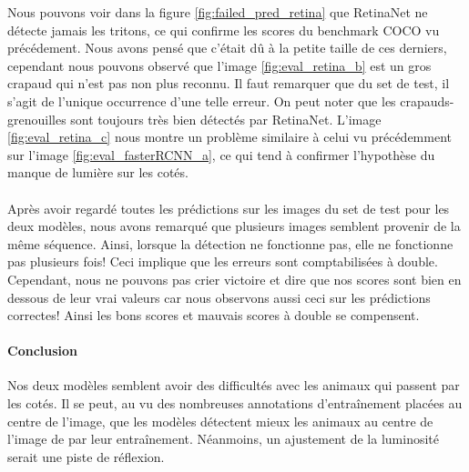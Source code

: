 Nous pouvons voir dans la figure \ref{fig:failed_pred_retina} que RetinaNet ne détecte jamais les tritons, ce qui confirme les scores du benchmark COCO vu précédement. Nous avons pensé que c'était dû à la petite taille de ces derniers, cependant nous pouvons observé que l'image \ref{fig:eval_retina_b} est un gros crapaud qui n'est pas non plus reconnu. Il faut remarquer que du set de test, il s'agit de l'unique occurrence d'une telle erreur.
On peut noter que les crapauds-grenouilles sont toujours très bien détectés par RetinaNet. L'image \ref{fig:eval_retina_c} nous montre un problème similaire à celui vu précédemment sur l'image \ref{fig:eval_fasterRCNN_a}, ce qui tend à confirmer l'hypothèse du manque de lumière sur les cotés.
\paragraph{}
 Après avoir regardé toutes les prédictions sur les images du set de test pour les deux modèles, nous avons remarqué que plusieurs images semblent provenir de la même séquence. Ainsi, lorsque la détection ne fonctionne pas, elle ne fonctionne pas plusieurs fois! Ceci implique que les erreurs sont comptabilisées à double. Cependant, nous ne pouvons pas crier victoire et dire que nos scores sont bien en dessous de leur vrai valeurs car nous observons aussi ceci sur les prédictions correctes! Ainsi les bons scores et mauvais scores à double se compensent.

 \paragraph{Conclusion} Nos deux modèles semblent avoir des difficultés avec les animaux qui passent par les cotés. Il se peut, au vu des nombreuses annotations d'entraînement placées au centre de l'image, que les modèles détectent mieux les animaux au centre de l'image de par leur entraînement. Néanmoins, un ajustement de la luminosité serait une piste de réflexion.
